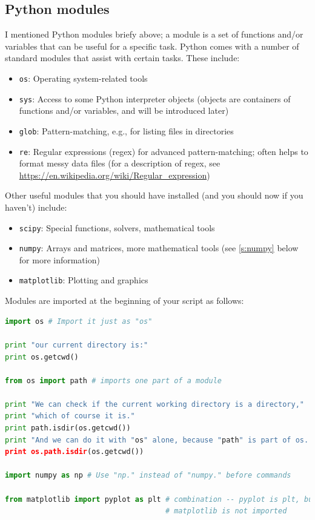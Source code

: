 \documentclass[a4paper,10pt]{scrartcl}
\begin{document}
\subsection{Python modules}

I mentioned Python modules briefy above; a module is a set of functions and/or variables that can be useful for a specific task. Python comes with a number of standard modules that assist with certain tasks. These include:
\begin{itemize}
 \item \lstinline{os}: Operating system-related tools
 \item \lstinline{sys}: Access to some Python interpreter objects (objects are containers of functions and/or variables, and will be introduced later)
 \item \lstinline{glob}: Pattern-matching, e.g., for listing files in directories
 \item \lstinline{re}: Regular expressions (regex) for advanced pattern-matching; often helps to format messy data files (for a description of regex, see \url{https://en.wikipedia.org/wiki/Regular_expression})
\end{itemize}

Other useful modules that you should have installed (and you should now if you haven't) include:
\begin{itemize}
 \item \lstinline{scipy}: Special functions, solvers, mathematical tools
 \item \lstinline{numpy}: Arrays and matrices, more mathematical tools (see \ref{s:numpy} below for more information)
 \item \lstinline{matplotlib}: Plotting and graphics
\end{itemize}


Modules are imported at the beginning of your script as follows:
\begin{lstlisting}[belowskip=-1.6\baselineskip, language=python]
import os # Import it just as "os"

print "our current directory is:"
print os.getcwd()

from os import path # imports one part of a module

print "We can check if the current working directory is a directory,"
print "which of course it is."
print path.isdir(os.getcwd())
print "And we can do it with "os" alone, because "path" is part of os.
print os.path.isdir(os.getcwd())

import numpy as np # Use "np." instead of "numpy." before commands

from matplotlib import pyplot as plt # combination -- pyplot is plt, but base
                                     # matplotlib is not imported
\end{lstlisting}
\end{document}
